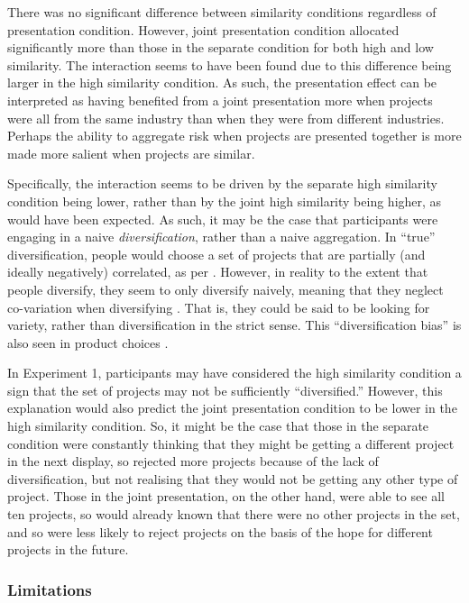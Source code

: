 \documentclass[a4paper, nobind, dvipsnames]{templates/ociamthesis}
\theoremstyle{definition}
\theoremstyle{definition}
\theoremstyle{definition}
\theoremstyle{definition}
\theoremstyle{remark}
\begin{document}
There was no significant difference between similarity conditions regardless of
presentation condition. However, joint presentation condition allocated
significantly more than those in the separate condition for both high and low
similarity. The interaction seems to have been found due to this difference
being larger in the high similarity condition. As such, the presentation effect
can be interpreted as having benefited from a joint presentation more when
projects were all from the same industry than when they were from different
industries. Perhaps the ability to aggregate risk when projects are presented
together is more made more salient when projects are similar.

Specifically, the interaction seems to be driven by the separate high similarity
condition being lower, rather than by the joint high similarity being higher, as
would have been expected. As such, it may be the case that participants were
engaging in a naive \emph{diversification}, rather than a naive aggregation. In
``true'' diversification, people would choose a set of projects that are partially
(and ideally negatively) correlated, as per \textcite{markowitz1952}. However, in reality
to the extent that people diversify, they seem to only diversify naively,
meaning that they neglect co-variation when diversifying \autocite[e.g.,][]{hedesstrom2006}. That is, they could be said to be looking for variety, rather
than diversification in the strict sense. This ``diversification bias'' is also
seen in product choices \autocite{read1995}.

In Experiment 1, participants may have considered the high similarity condition
a sign that the set of projects may not be sufficiently ``diversified.'' However,
this explanation would also predict the joint presentation condition to be lower
in the high similarity condition. So, it might be the case that those in the
separate condition were constantly thinking that they might be getting a
different project in the next display, so rejected more projects because of the
lack of diversification, but not realising that they would not be getting any
other type of project. Those in the joint presentation, on the other hand, were
able to see all ten projects, so would already known that there were no other
projects in the set, and so were less likely to reject projects on the basis of
the hope for different projects in the future.

\subsubsection{Limitations}
\end{document}
